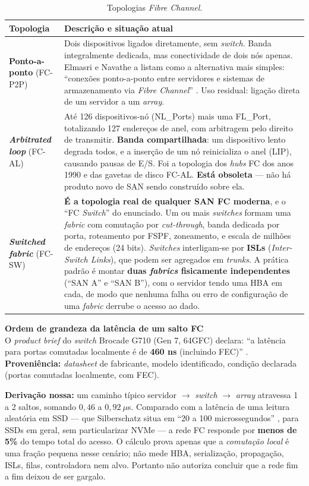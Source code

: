 \documentclass[11pt,a4paper]{article}
\newcommand{\destaque}[2]{%
  \begin{center}\begin{minipage}{0.96\textwidth}
  \colorbox{fundo}{\begin{minipage}{\dimexpr\linewidth-2\fboxsep}
  \vspace{2pt}\textbf{\color{azul}\small #1}\\[1pt]\footnotesize #2\vspace{3pt}
  \end{minipage}}\end{minipage}\end{center}}
\begin{document}
\begin{table}[H]
\centering
\caption{Topologias \textit{Fibre Channel}.}
\label{tab:topologias}
{\footnotesize
\begin{tabular}{@{}lp{11.2cm}@{}}
\toprule
\textbf{Topologia} & \textbf{Descrição e situação atual} \\
\midrule
\textbf{Ponto-a-ponto} (FC-P2P) & Dois dispositivos ligados diretamente, sem \textit{switch}. Banda
integralmente dedicada, mas conectividade de dois nós apenas. Elmasri e Navathe a listam como a
alternativa mais simples: ``conexões ponto-a-ponto entre servidores e sistemas de armazenamento via
\textit{Fibre Channel}'' \cite{elmasri2018}. Uso residual: ligação direta de um servidor a um
\textit{array}. \\
\addlinespace
\textbf{\textit{Arbitrated loop}} (FC-AL) & Até 126 dispositivos-nó (NL\_Ports) mais uma FL\_Port,
totalizando 127 endereços de anel, com arbitragem pelo direito de transmitir. \textbf{Banda compartilhada}: um dispositivo lento degrada
todos, e a inserção de um nó reinicializa o anel (LIP), causando pausas de E/S. Foi a topologia dos
\textit{hubs} FC dos anos 1990 e das gavetas de disco FC-AL. \textbf{Está obsoleta} --- não há
produto novo de SAN sendo construído sobre ela. \\
\addlinespace
\textbf{\textit{Switched fabric}} (FC-SW) & \textbf{É a topologia real de qualquer SAN FC moderna},
e o ``FC \textit{Switch}'' do enunciado. Um ou mais \textit{switches} formam uma \textit{fabric}
com comutação por \textit{cut-through}, banda dedicada por porta, roteamento por FSPF,
zoneamento, e escala de milhões de endereços (24 bits). \textit{Switches} interligam-se por
\textbf{ISLs} (\textit{Inter-Switch Links}), que podem ser agregados em \textit{trunks}. A prática
padrão é montar \textbf{duas \textit{fabrics} fisicamente independentes} (``SAN A'' e ``SAN B''),
com o servidor tendo uma HBA em cada, de modo que nenhuma falha ou erro de configuração de uma
\textit{fabric} derrube o acesso ao dado. \\
\bottomrule
\end{tabular}}
\end{table}

\destaque{Ordem de grandeza da latência de um salto FC}{%
O \textit{product brief} do \textit{switch} Brocade G710 (Gen 7, 64GFC) declara: ``a latência para
portas comutadas localmente é de \textbf{460 ns} (incluindo FEC)'' \cite{brocadeg710}.
\textbf{Proveniência:} \textit{datasheet} de fabricante, modelo identificado, condição declarada
(portas comutadas localmente, com FEC).

\smallskip
\textbf{Derivação nossa:} um caminho típico servidor $\rightarrow$ \textit{switch} $\rightarrow$
\textit{array} atravessa 1 a 2 saltos, somando $0{,}46$ a $0{,}92\ \mu$s. Comparado com a latência
de uma leitura aleatória em SSD --- que Silberschatz situa em ``20 a 100 microssegundos''
\cite{silberschatz2020}, para SSDs em geral, sem particularizar NVMe --- a rede FC responde por
\textbf{menos de 5\%} do tempo total do acesso.
O cálculo prova apenas que a \emph{comutação local} é uma fração pequena nesse cenário; não
mede HBA, serialização, propagação, ISLs, filas, controladora nem alvo. Portanto não autoriza
concluir que a rede fim a fim deixou de ser gargalo.}
\end{document}
